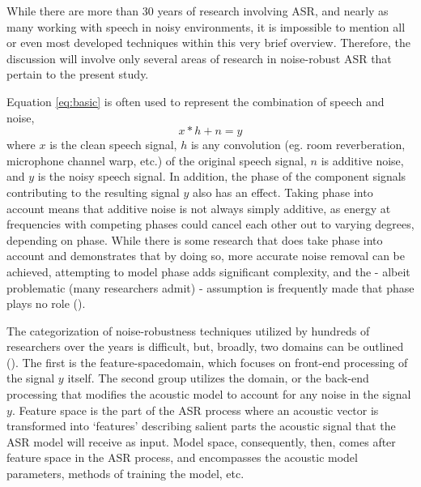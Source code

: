 While there are more than 30 years of research involving ASR, and nearly as many working with speech in noisy environments, it is impossible to mention all or even most developed techniques within this very brief overview.  Therefore, the discussion will involve only several areas of research in noise-robust ASR that pertain to the present study.

Equation \ref{eq:basic} is often used to represent the combination of speech and noise,
\begin{equation}\label{eq:basic}
x * h + n = y
\end{equation}
where $x$ is the clean speech signal, $h$ is any convolution (eg. room reverberation, microphone channel warp, etc.) of the original speech signal, $n$ is additive noise, and $y$ is the noisy speech signal.  In addition, the phase of the component signals contributing to the resulting signal $y$ also has an effect.  Taking phase into account means that additive noise is not always simply additive, as energy at frequencies with competing phases could cancel each other out to varying degrees, depending on phase.  While there is some research that does take phase into account and demonstrates that by doing so, more accurate noise removal can be achieved, attempting to model phase adds significant complexity, and the - albeit problematic (many researchers admit) - assumption is frequently made that phase plays no role (\cite{li:14}).  


The categorization of noise-robustness techniques utilized by hundreds of researchers over the years is difficult, but, broadly, two domains can be outlined (\cite{li:14,zhang:17}).  The first is the \DIFdelbegin {}\DIFdelend \DIFaddbegin {}\DIFaddend feature-space\DIFdelbegin {}\DIFdelend \DIFaddbegin {}\DIFaddend domain, which focuses on front-end processing of the signal $y$ itself.  The second group utilizes the \DIFdelbegin {}\DIFdelend \DIFaddbegin {}\DIFaddend domain, or the back-end processing that modifies the acoustic model to account for any noise in the signal $y$.  Feature space is the part of the ASR process where an acoustic vector is transformed into `features' describing salient parts the acoustic signal that the ASR model will receive as input.  Model space, consequently, then, comes after feature space in the ASR process, and encompasses the acoustic model parameters, methods of training the model, etc.  

